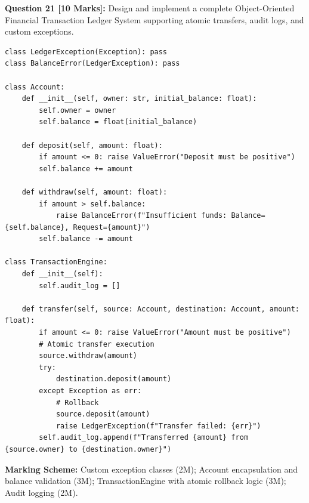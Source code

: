 \noindent\textbf{Question 21 [10 Marks]:} Design and implement a complete Object-Oriented Financial Transaction Ledger System supporting atomic transfers, audit logs, and custom exceptions.
\begin{solutionbox}
\begin{lstlisting}
class LedgerException(Exception): pass
class BalanceError(LedgerException): pass

class Account:
    def __init__(self, owner: str, initial_balance: float):
        self.owner = owner
        self.balance = float(initial_balance)

    def deposit(self, amount: float):
        if amount <= 0: raise ValueError("Deposit must be positive")
        self.balance += amount

    def withdraw(self, amount: float):
        if amount > self.balance:
            raise BalanceError(f"Insufficient funds: Balance={self.balance}, Request={amount}")
        self.balance -= amount

class TransactionEngine:
    def __init__(self):
        self.audit_log = []

    def transfer(self, source: Account, destination: Account, amount: float):
        if amount <= 0: raise ValueError("Amount must be positive")
        # Atomic transfer execution
        source.withdraw(amount)
        try:
            destination.deposit(amount)
        except Exception as err:
            # Rollback
            source.deposit(amount)
            raise LedgerException(f"Transfer failed: {err}")
        self.audit_log.append(f"Transferred {amount} from {source.owner} to {destination.owner}")
\end{lstlisting}
\end{solutionbox}
\begin{markingrubric}
\textbf{Marking Scheme:} Custom exception classes (2M); Account encapsulation and balance validation (3M); TransactionEngine with atomic rollback logic (3M); Audit logging (2M).
\end{markingrubric}

